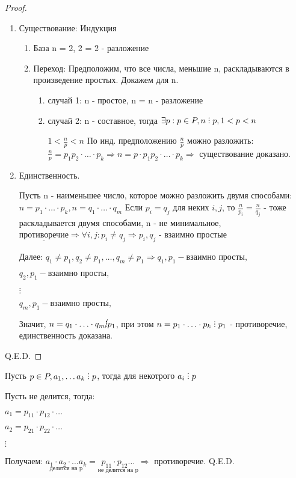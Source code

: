 \begin{proof}
  
  \begin{enumerate}
    \item Существование: Индукция
    
    \begin{enumerate}
      \item База n = 2, 2 = 2 - разложение
      \item Переход: Предположим, что все числа, меньшие n, раскладываются в произведение простых. Докажем для n.
      
      \begin{enumerate}
        \item случай 1: n - простое, n = n - разложение
        \item случай 2: n - составное, тогда $\exists p: p \in P, n \divby p, 1 < p < n$
        
        $1 < \frac{n}{p} < n$ По инд. предположению $\frac{n}{p}$ можно разложить: $\frac{n}{p} = p_1p_2 \cdot \ldots \cdot p_k \Rightarrow n = p \cdot p_1p_2 \cdot \ldots \cdot p_k \Rightarrow$ существование доказано.
        
      \end{enumerate}
    \end{enumerate}
    \item Единственность.
    
    Пусть n - наименьшее число, которое можно разложить двумя способами:
    $n = p_1 \cdot \ldots \cdot p_k, n = q_1 \cdot \ldots \cdot q_m$ Если $p_i = q_j$ для неких $i, j$, то $\frac{n}{p_i} = \frac{n}{q_j}$ - тоже раскладывается двумя способами, n - не минимальное, $\underline{\text{противоречие}} \Rightarrow \forall i, j: p_i \neq q_j \Rightarrow p_i, q_j$  - взаимно простые
    
    Далее: $q_1 \neq p_1, q_2 \neq p_1, \ldots, q_m \neq p_1 \Rightarrow q_1, p_1 - \text{взаимно просты},$

    $q_2, p_1 - \text{взаимно просты},$

    $\vdots$

    $q_m, p_1 - \text{взаимно просты},$

    Значит, $n = q_1 \cdot \ldots \cdot q_m \cancel{\divby} p_1$, при этом $n = p_1 \cdot \ldots \cdot p_k \divby p_1$ - противоречие, единственность доказана.
  \end{enumerate} Q.E.D.
\end{proof}

\begin{property} 
  Пусть $p \in P, a_1, \ldots a_k \divby p$, тогда для некотрого $a_i \divby p$

  Пусть не делится, тогда:

  $a_1 = p_{11} \cdot p_{12} \cdot \ldots$

  $a_2 = p_{21} \cdot p_{22} \cdot \ldots$

  $\vdots$

  Получаем: $\underset{\text{делится на p}}{a_1 \cdot a_2 \cdot \ldots a_k} = \underset{\text{не делится на p}}{p_{11} \cdot p_{12} \ldots} \Rightarrow$ противоречие. Q.E.D. 
\end{property}
